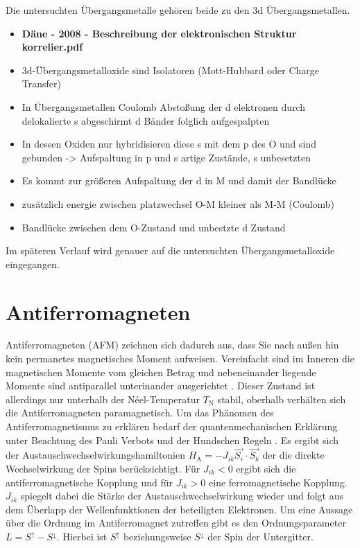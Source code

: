         Die untersuchten Übergangsmetalle gehören beide zu den 3d Übergangsmetallen.

        
        \begin{itemize}
            \item \textbf{Däne - 2008 - Beschreibung der elektronischen Struktur korrelier.pdf}
            \item 3d-Übergangsmetalloxide sind Isolatoren (Mott-Hubbard oder Charge Transfer)
            \item In Übergangsmetallen Coulomb Abstoßung der d elektronen durch delokalierte s abgeschirmt d Bänder folglich aufgespalpten
            \item In dessen Oxiden nur hybridisieren diese s mit dem p des O und sind gebunden -> Aufspaltung in p und s artige Zustände, s unbesetzten
            \item Es kommt zur größeren Aufspaltung der d in M und damit der Bandlücke
            \item zusätzlich energie zwischen platzwechsel O-M kleiner als M-M (Coulomb)
            \item Bandlücke zwischen dem O-Zustand und unbestzte d Zustand
        \end{itemize}

        Im späteren Verlauf wird genauer auf die untersuchten Übergangsmetalloxide eingegangen.

    
    \section{Antiferromagneten}
        Antiferromagneten (AFM) zeichnen sich dadurch aus, dass Sie nach außen hin kein permanetes magnetisches Moment aufweisen.
        Vereinfacht sind im Inneren die magnetischen Momente vom gleichen Betrag und nebeneinander liegende Momente sind antiparallel unterinander ausgerichtet \cite{Suter}.
        Dieser Zustand ist allerdings nur unterhalb der Néel-Temperatur $T_\text{N}$ stabil, oberhalb verhälten sich die Antiferromagneten paramagnetisch.
        Um das Phänomen des Antiferromagnetismus zu erklären bedarf der quantenmechanischen Erklärung unter Beachtung des Pauli Verbots und der Hundschen Regeln \cite{TUChemnitz}.
        Es ergibt sich der Austauschwechselwirkungshamiltonien $H_\text{A} = - J_{ik} \vec{S_i}\cdot\vec{S_k}$ der die direkte Wechselwirkung der Spins berücksichtigt.
        Für $J_{ik} < 0$ ergibt sich die antiferromagnetische Kopplung und für $J_{ik} > 0$ eine ferromagnetische Kopplung.
        $J_{ik}$ spiegelt dabei die Stärke der Austauschwechselwirkung wieder und folgt aus dem Überlapp der Wellenfunktionen der beteiligten Elektronen.
        Um eine Aussage über die Ordnung im Antiferromagnet zutreffen gibt es den Ordnungsparameter $L = S^{\uparrow} - S^{\downarrow}$.
        Hierbei ist $S^{\uparrow}$ beziehungsweise $S^{\downarrow}$ der Spin der Untergitter.

